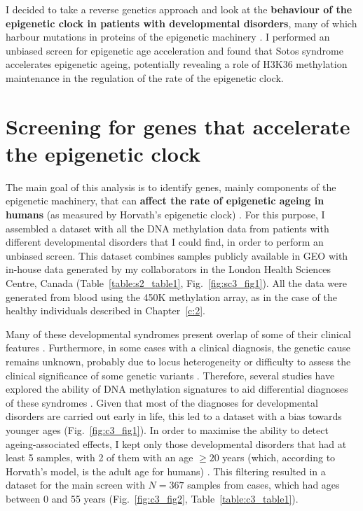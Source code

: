 \bigskip

I decided to take a reverse genetics approach and look at the \textbf{behaviour of the epigenetic clock in patients with developmental disorders}, many of which harbour mutations in proteins of the epigenetic machinery \cite{Aref-Eshghi2018,Bjornsson2015}. I performed an unbiased screen for epigenetic age acceleration and found that Sotos syndrome accelerates epigenetic ageing, potentially revealing a role of H3K36 methylation maintenance in the regulation of the rate of the epigenetic clock.

\smallskip

\section{Screening for genes that accelerate the epigenetic clock} \label{s:3.2}

\smallskip

The main goal of this analysis is to identify genes, mainly components of the epigenetic machinery, that can \textbf{affect the rate of epigenetic ageing in humans} (as measured by Horvath’s epigenetic clock) \cite{Horvath2013}. For this purpose, I assembled a dataset with all the DNA methylation data from patients with different developmental disorders that I could find, in order to perform an unbiased screen. This dataset combines samples publicly available in GEO \cite{Edgar2002} with in-house data generated by my collaborators in the London Health Sciences Centre, Canada (Table~\ref{table:s2_table1}, Fig.~\ref{fig:sc3_fig1}). All the data were generated from blood using the 450K methylation array, as in the case of the healthy individuals described in Chapter~\ref{c:2}.   

\bigskip

Many of these developmental syndromes present overlap of some of their clinical features \cite{Aref-Eshghi2018, Bjornsson2015}. Furthermore, in some cases with a clinical diagnosis, the genetic cause remains unknown, probably due to locus heterogeneity or difficulty to assess the clinical significance of some genetic variants \cite{Aref-Eshghi2017}. Therefore, several studies have explored the ability of DNA methylation signatures to aid differential diagnoses of these syndromes \cite{Aref-Eshghi2018,Aref-Eshghi2017,Aref-Eshghi2018a,Butcher2017,Choufani2015,Schenkel2016,Alisch2013,Schenkel2017,Hood2016,Aldinger2013,Grafodatskaya2013,Kernohan2016}. Given that most of the diagnoses for developmental disorders are carried out early in life, this led to a dataset with a bias towards younger ages (Fig.~\ref{fig:c3_fig1}). In order to maximise the ability to detect ageing-associated effects, I kept only those developmental disorders that had at least 5 samples, with 2 of them with an age $\geq 20$ years (which, according to Horvath's model, is the adult age for humans) \cite{Horvath2013}. This filtering resulted in a dataset for the main screen with $N = 367$ samples from cases, which had ages between 0 and 55 years (Fig.~\ref{fig:c3_fig2}, Table~\ref{table:c3_table1}).

